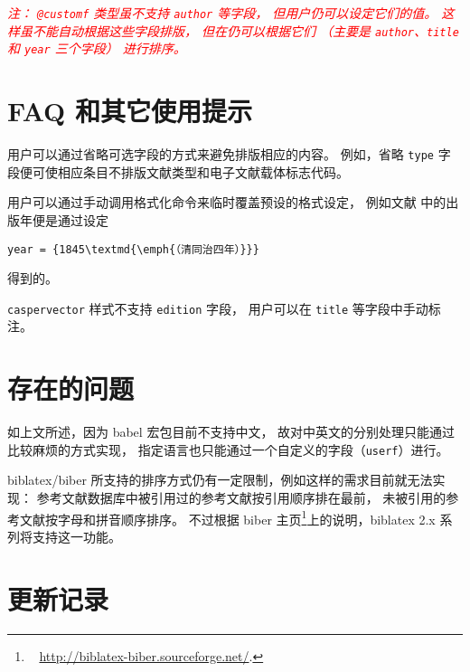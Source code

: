 \documentclass[UTF8, fancyhdr, hyperref]{ctexart}
\newcommand{\myemph}[1]{\emph{\textcolor{red}{#1}}}
\begin{document}
\myemph{%
	注：
	\texttt{@customf} 类型虽不支持 \texttt{author} 等字段，
	但用户仍可以设定它们的值。
	这样虽不能自动根据这些字段排版，
	但在仍可以根据它们
	（主要是 \texttt{author}、\texttt{title} 和 \texttt{year} 三个字段）
	进行排序。 %
}

\section{FAQ 和其它使用提示}

用户可以通过省略可选字段的方式来避免排版相应的内容。
例如，省略 \verb|type| 字段便可使相应条目不排版文献类型和电子文献载体标志代码。

用户可以通过手动调用格式化命令来临时覆盖预设的格式设定，
例如文献 \parencite{1-7} 中的出版年便是通过设定
\begin{Verbatim}[frame = single]
year = {1845\textmd{\emph{（清同治四年）}}}
\end{Verbatim}
得到的。

\verb|caspervector| 样式不支持 \verb|edition| 字段，
用户可以在 \verb|title| 等字段中手动标注。

\section{存在的问题}

如上文所述，因为 babel 宏包目前不支持中文，
故对中英文的分别处理只能通过比较麻烦的方式实现，
指定语言也只能通过一个自定义的字段（\verb|userf|）进行。

biblatex/biber 所支持的排序方式仍有一定限制，例如这样的需求目前就无法实现：
参考文献数据库中被引用过的参考文献按引用顺序排在最前，
未被引用的参考文献按字母和拼音顺序排序。
不过根据 biber 主页\footnote{\ %
	\url{http://biblatex-biber.sourceforge.net/}.%
}上的说明，biblatex 2.x 系列将支持这一功能。

\section{更新记录}

\printbibliography%
	[category = cited, heading = bibnumbered, title = {本文参考文献}]
\printbibliography[
	notcategory = cited, heading = bibnumbered,
	title = {%
		其它参考文献示例
		（引自\texorpdfstring{文献 \parencite{gbt7714-2005}}{ GB/T 7714-2005}）
	}
]
\end{document}
